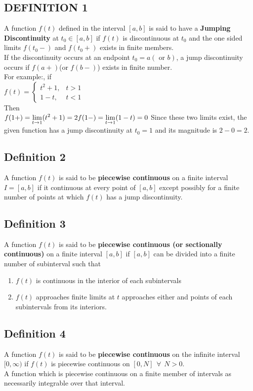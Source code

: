 \documentclass[11pt]{report}
\newcommand{\ft}{f(t)}
\newcommand{\sps}{\\[0.2cm]}
\newcommand{\bt}[1]{\textbf{#1}}
\newcommand{\dsp}{\displaystyle}
\begin{document}
	\subsection{DEFINITION 1}
	A function $\ft$ defined in the interval $[a,b]$ is said to have a \bt{Jumping Discontinuity} at $t_0\in [a,b]$ if $\ft$ is discontinuous at $t_0$ and the one sided limits $f(t_0-)$ and $f(t_0+)$ exists in finite members.\sps
	If the discontinuity occurs at an endpoint $t_0=a(\text{ or } b)$, a jump discontinuity occurs if $f(a+)$(or $f(b-)$) exists in finite number.\sps
	For example:, if\\
	$\dsp f(t) = \left\{ \begin{array}{lr}
		t^2 + 1, & t>1\\
		1-t, & t<1
	\end{array} \right.
	$\sps
	Then \sps
	$\dsp
		f(1+) = \lim\limits_{t\rightarrow 1}(t^2+1) = 2\sps
		f(1-) = \lim\limits_{t\rightarrow 1}(1-t) = 0\sps
	$
	Since these two limits exist, the given function has a jump discontinuity at $t_0=1$ and its magnitude is $2-0=2$.
	
	\subsection{Definition 2}
	A function $\ft$ is said to be \bt{piecewise continuous} on a finite interval $I=[a,b]$ if it continuous at every point of $[a,b]$ except possibly for a finite number of points at which $\ft$ has a jump discontinuity.
	
	\subsection{Definition 3}
	\label{sec:2_2_3}
	A function $\ft$ is said to be \bt{piecewise continuous (or sectionally continuous)} on a finite interval $[a,b]$ if $[a,b]$ can be divided into a finite number of subinterval such that 
	\begin{enumerate}
		\item $\ft$ is continuous in the interior of each subintervals
		\item $\ft$ approaches finite limits at $t$ approaches either and points of each subintervals from its interiors.
	\end{enumerate}	
	
	\subsection{Definition 4}
	A function $\ft$ is said to be \bt{piecewise continuous} on the infinite interval $[0,\infty)$ if $\ft$ is piecewise continuous on $[0, N]~~\forall~~ N>0$.\sps
	A function which is piecewise continuous on a finite member of intervals as necessarily integrable over that interval.
	
\end{document}
